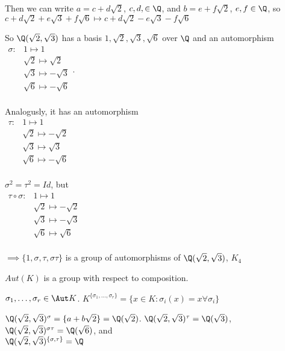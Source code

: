 \documentclass[10pt]{article}
\begin{document}
Then we can write $a = c + d\sqrt{2}$, $c, d, \in \Q$, and $b = e + f\sqrt{2}$, $e, f \in \Q$, so $c + d\sqrt{2} + e\sqrt{3} + f\sqrt{6} \mapsto c + d\sqrt{2} - e\sqrt{3} - f\sqrt{6}$

So $\Q(\sqrt2, \sqrt3)$ has a basis $1, \sqrt{2}, \sqrt3, \sqrt6$ over $\Q$ and an automorphism \\
$\begin{matrix}
    \sigma: & 1 \mapsto 1\\
    & \sqrt{2} \mapsto \sqrt{2}\\
    & \sqrt{3} \mapsto -\sqrt{3}\\
    & \sqrt{6} \mapsto -\sqrt{6}\\
\end{matrix}$. 

Analogusly, it has an automorphism\\
$\begin{matrix}
    \tau : & 1 \mapsto 1\\
    & \sqrt{2} \mapsto -\sqrt{2}\\
    & \sqrt{3} \mapsto \sqrt{3}\\
    & \sqrt{6} \mapsto -\sqrt{6}\\
\end{matrix}$

$\sigma^2 = \tau^2 = Id$, but \\
$\begin{matrix}
    \tau \circ \sigma : & 1 \mapsto 1\\
    & \sqrt{2} \mapsto -\sqrt{2}\\
    & \sqrt{3} \mapsto -\sqrt{3}\\ 
    & \sqrt{6} \mapsto \sqrt{6}\\
\end{matrix}$

$\implies \{1, \sigma, \tau, \sigma\tau\}$ is a group of automorphisms of $\Q(\sqrt{2}, \sqrt{3})$, $K_4$

\begin{rmk}
    $Aut(K)$ is a group with respect to composition. 
\end{rmk}

\begin{defn}
    $\sigma_1, \ldots, \sigma_r \in \Aut K$. $K^{\{\sigma_1,\ldots,  \sigma_r\}} = \{x \in K: \sigma_i(x) = x \forall \sigma_i\}$
\end{defn}

\begin{exm*}
    $\Q(\sqrt2, \sqrt3)^\sigma = \{a + b\sqrt{2}\} = \Q(\sqrt{2})$.
    $\Q(\sqrt{2}, \sqrt{3})^\tau = \Q(\sqrt{3})$, 
    $\Q(\sqrt{2}, \sqrt{3})^{\sigma\tau} = \Q(\sqrt{6})$, 
    and \\$\Q(\sqrt2, \sqrt3)^{\{\sigma, \tau\}} = \Q$
\end{exm*}
\end{document}
